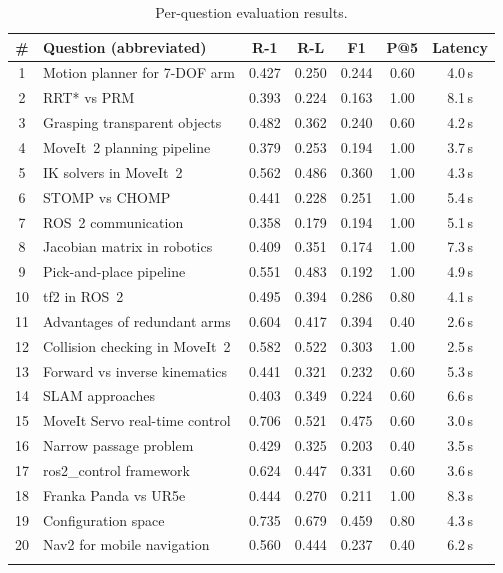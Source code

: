 \documentclass[12pt, a4paper]{article}
\begin{document}
\begin{longtable}{@{}clccccc@{}}
\toprule
\textbf{\#} & \textbf{Question (abbreviated)} & \textbf{R-1} & \textbf{R-L} & \textbf{F1} & \textbf{P@5} & \textbf{Latency} \\
\midrule
\endhead
1  & Motion planner for 7-DOF arm       & 0.427 & 0.250 & 0.244 & 0.60 & 4.0\,s \\
2  & RRT* vs PRM                        & 0.393 & 0.224 & 0.163 & 1.00 & 8.1\,s \\
3  & Grasping transparent objects        & 0.482 & 0.362 & 0.240 & 0.60 & 4.2\,s \\
4  & MoveIt~2 planning pipeline          & 0.379 & 0.253 & 0.194 & 1.00 & 3.7\,s \\
5  & IK solvers in MoveIt~2             & 0.562 & 0.486 & 0.360 & 1.00 & 4.3\,s \\
6  & STOMP vs CHOMP                     & 0.441 & 0.228 & 0.251 & 1.00 & 5.4\,s \\
7  & ROS~2 communication                & 0.358 & 0.179 & 0.194 & 1.00 & 5.1\,s \\
8  & Jacobian matrix in robotics        & 0.409 & 0.351 & 0.174 & 1.00 & 7.3\,s \\
9  & Pick-and-place pipeline            & 0.551 & 0.483 & 0.192 & 1.00 & 4.9\,s \\
10 & tf2 in ROS~2                       & 0.495 & 0.394 & 0.286 & 0.80 & 4.1\,s \\
11 & Advantages of redundant arms       & 0.604 & 0.417 & 0.394 & 0.40 & 2.6\,s \\
12 & Collision checking in MoveIt~2     & 0.582 & 0.522 & 0.303 & 1.00 & 2.5\,s \\
13 & Forward vs inverse kinematics      & 0.441 & 0.321 & 0.232 & 0.60 & 5.3\,s \\
14 & SLAM approaches                    & 0.403 & 0.349 & 0.224 & 0.60 & 6.6\,s \\
15 & MoveIt Servo real-time control     & 0.706 & 0.521 & 0.475 & 0.60 & 3.0\,s \\
16 & Narrow passage problem             & 0.429 & 0.325 & 0.203 & 0.40 & 3.5\,s \\
17 & ros2\_control framework            & 0.624 & 0.447 & 0.331 & 0.60 & 3.6\,s \\
18 & Franka Panda vs UR5e               & 0.444 & 0.270 & 0.211 & 1.00 & 8.3\,s \\
19 & Configuration space                & 0.735 & 0.679 & 0.459 & 0.80 & 4.3\,s \\
20 & Nav2 for mobile navigation         & 0.560 & 0.444 & 0.237 & 0.40 & 6.2\,s \\
\bottomrule
\caption{Per-question evaluation results.}
\end{longtable}
\end{document}

